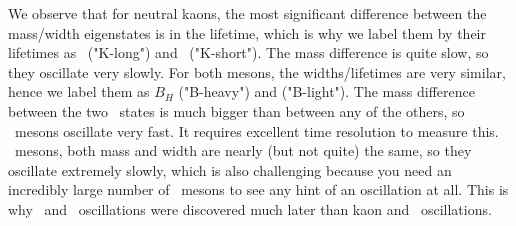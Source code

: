 We observe that for neutral kaons, the most significant difference between the mass/width eigenstates is in the lifetime, which is why we label them by their lifetimes as \Kl\ ("K-long") and \Ks\ ("K-short"). The mass difference is quite slow, so they oscillate very slowly. For both  mesons, the widths/lifetimes are very similar, hence we label them as $B_H$ ("B-heavy") and  ("B-light"). The mass difference between the two \Bso\ states is much bigger than between any of the others, so \Bso\ mesons oscillate very fast. It requires excellent time resolution to measure this. \Do\ mesons, both mass and width are nearly (but not quite) the same, so they oscillate extremely slowly, which is also challenging because you need an incredibly large number of \Do\ mesons to see any hint of an oscillation at all. This is why \Bso\ and \Do\ oscillations were discovered much later than kaon and \Bdo\ oscillations.


